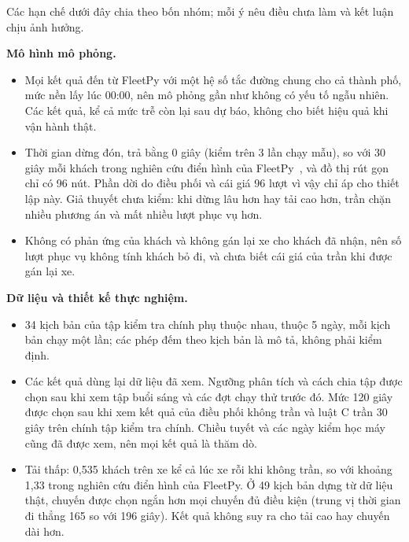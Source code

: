 Các hạn chế dưới đây chia theo bốn nhóm; mỗi ý nêu điều chưa làm và kết luận chịu ảnh hưởng.

\textbf{Mô hình mô phỏng.}
\begin{itemize}[leftmargin=1.2cm,itemsep=2pt,topsep=3pt]
\item Mọi kết quả đến từ FleetPy với một hệ số tắc đường chung cho cả thành phố, mức nền lấy lúc 00:00, nên mô phỏng gần
như không có yếu tố ngẫu nhiên. Các kết quả, kể cả mức trễ còn lại sau dự báo, không cho biết hiệu quả khi vận hành thật.
\item Thời gian dừng đón, trả bằng 0 giây (kiểm trên 3 lần chạy mẫu), so với 30 giây mỗi khách trong nghiên cứu điển hình
của FleetPy~\cite{engelhardt2026}, và đồ thị rút gọn chỉ có 96 nút. Phần dời do điều phối và cái giá 96 lượt vì vậy chỉ áp cho
thiết lập này. Giả thuyết chưa kiểm: khi dừng lâu hơn hay tải cao hơn, trần chặn nhiều phương án và mất nhiều lượt phục
vụ hơn.
\item Không có phản ứng của khách và không gán lại xe cho khách đã nhận, nên số lượt phục vụ không tính khách bỏ đi, và
chưa biết cái giá của trần khi được gán lại xe.
\end{itemize}

\textbf{Dữ liệu và thiết kế thực nghiệm.}
\begin{itemize}[leftmargin=1.2cm,itemsep=2pt,topsep=3pt]
\item 34 kịch bản của tập kiểm tra chính phụ thuộc nhau, thuộc 5 ngày, mỗi kịch bản chạy một lần; các phép đếm theo
kịch bản là mô tả, không phải kiểm định.
\item Các kết quả dùng lại dữ liệu đã xem. Ngưỡng phân tích và cách chia tập được chọn sau khi xem tập buổi sáng và các
đợt chạy thử trước đó. Mức 120 giây được chọn sau khi xem kết quả của điều phối không trần và luật C trần 30 giây trên
chính tập kiểm tra chính. Chiều tuyết và các ngày kiểm học máy cũng đã được xem, nên mọi kết quả là thăm dò.
\item Tải thấp: 0,535 khách trên xe kể cả lúc xe rỗi khi không trần, so với khoảng 1,33 trong nghiên cứu điển hình của
FleetPy. Ở 49 kịch bản dựng từ dữ liệu thật, chuyến được chọn ngắn hơn mọi chuyến đủ điều kiện (trung vị thời gian đi thẳng 165
so với 196 giây). Kết quả không suy ra cho tải cao hay chuyến dài hơn.
\end{itemize}

